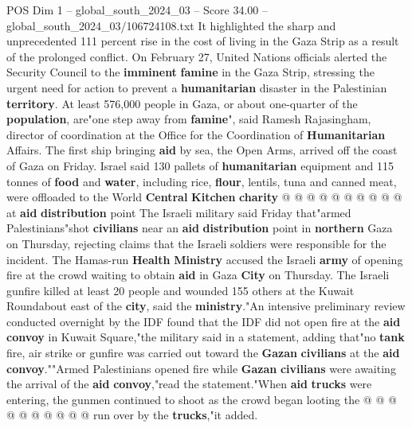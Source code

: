 \begin{textsample}{POS Dim 1 – global\_south\_2024\_03 – Score 34.00 – global\_south\_2024\_03/106724108.txt}
It highlighted the sharp and unprecedented 111 percent rise in the cost of living in the Gaza Strip as a result of the prolonged conflict.
On February 27, United Nations officials alerted the Security Council to the \textbf{imminent} \textbf{famine} in the Gaza Strip, stressing the urgent need for action to prevent a \textbf{humanitarian} disaster in the Palestinian \textbf{territory}.
At least 576,000 people in Gaza, or about one-quarter of the \textbf{population}, are"one step away from \textbf{famine}", said Ramesh Rajasingham, director of coordination at the Office for the Coordination of \textbf{Humanitarian} Affairs.
The first ship bringing \textbf{aid} by sea, the Open Arms, arrived off the coast of Gaza on Friday.
Israel said 130 pallets of \textbf{humanitarian} equipment and 115 tonnes of \textbf{food} and \textbf{water}, including rice, \textbf{flour}, lentils, tuna and canned meat, were offloaded to the World \textbf{Central} \textbf{Kitchen} \textbf{charity} @ @ @ @ @ @ @ @ @ @ at \textbf{aid} \textbf{distribution} point The Israeli military said Friday that"armed Palestinians"shot \textbf{civilians} near an \textbf{aid} \textbf{distribution} point in \textbf{northern} Gaza on Thursday, rejecting claims that the Israeli soldiers were responsible for the incident.
The Hamas-run \textbf{Health} \textbf{Ministry} accused the Israeli \textbf{army} of opening fire at the crowd waiting to obtain \textbf{aid} in Gaza \textbf{City} on Thursday.
The Israeli gunfire killed at least 20 people and wounded 155 others at the Kuwait Roundabout east of the \textbf{city}, said the \textbf{ministry}."An intensive preliminary review conducted overnight by the IDF found that the IDF did not open fire at the \textbf{aid} \textbf{convoy} in Kuwait Square,"the military said in a statement, adding that"no \textbf{tank} fire, air strike or gunfire was carried out toward the \textbf{Gazan} \textbf{civilians} at the \textbf{aid} \textbf{convoy}.""Armed Palestinians opened fire while \textbf{Gazan} \textbf{civilians} were awaiting the arrival of the \textbf{aid} \textbf{convoy},"read the statement."When \textbf{aid} \textbf{trucks} were entering, the gunmen continued to shoot as the crowd began looting the @ @ @ @ @ @ @ @ @ @ run over by the \textbf{trucks},"it added.

\end{textsample}
